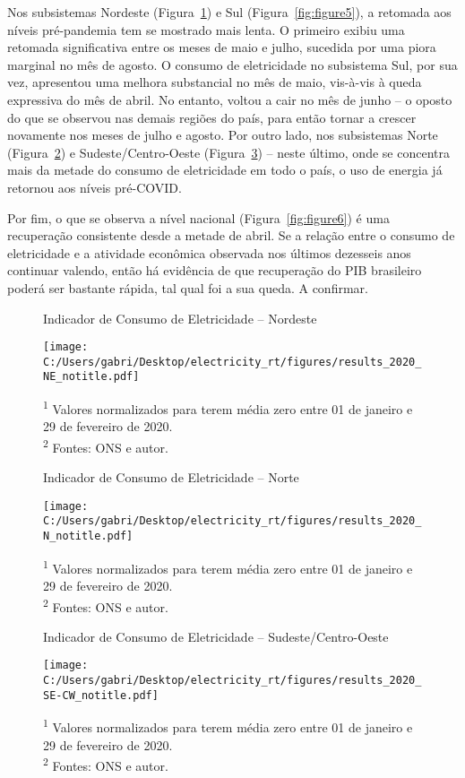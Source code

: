 \documentclass[12pt]{article}
\begin{document}
Nos subsistemas Nordeste (Figura~{\ref{fig:figure2}}) e Sul (Figura~{\ref{fig:figure5}}), a retomada aos níveis pré-pandemia tem se mostrado mais lenta. O primeiro exibiu uma retomada significativa entre os meses de maio e julho, sucedida por uma piora marginal no mês de agosto. O consumo de eletricidade no subsistema Sul, por sua vez, apresentou uma melhora substancial no mês de maio, vis-à-vis à queda expressiva do mês de abril. No entanto, voltou a cair no mês de junho -- o oposto do que se observou nas demais regiões do país, para então tornar a crescer novamente nos meses de julho e agosto. Por outro lado, nos subsistemas Norte (Figura~{\ref{fig:figure3}}) e Sudeste/Centro-Oeste (Figura~{\ref{fig:figure4}}) -- neste último, onde se concentra mais da metade do consumo de eletricidade em todo o país, o uso de energia já retornou aos níveis pré-COVID. 

Por fim, o que se observa a nível nacional (Figura~{\ref{fig:figure6}}) é uma recuperação consistente desde a metade de abril. Se a relação entre o consumo de eletricidade e a atividade econômica observada nos últimos dezesseis anos continuar valendo, então há evidência de que recuperação do PIB brasileiro poderá ser bastante rápida, tal qual foi a sua queda. A confirmar. \vspace{5pt}

\begin{figure}[!htb]
	\centering
	\caption{Indicador de Consumo de Eletricidade -- Nordeste}
	\label{fig:figure2}
	\texttt{[image: C:/Users/gabri/Desktop/electricity\_rt/figures/results\_2020\_NE\_notitle.pdf]}
	\caption*{\textsuperscript{1} Valores normalizados para terem média zero entre 01 de janeiro e 29 de fevereiro de 2020. \\ \textsuperscript{2} Fontes: ONS e autor.}
\end{figure}

\begin{figure}[!htb]
	\centering
	\caption{Indicador de Consumo de Eletricidade -- Norte}
	\label{fig:figure3}
	\texttt{[image: C:/Users/gabri/Desktop/electricity\_rt/figures/results\_2020\_N\_notitle.pdf]}
	\caption*{\textsuperscript{1} Valores normalizados para terem média zero entre 01 de janeiro e 29 de fevereiro de 2020. \\ \textsuperscript{2} Fontes: ONS e autor.}
\end{figure}

\begin{figure}[!htb]
	\centering
	\caption{Indicador de Consumo de Eletricidade -- Sudeste/Centro-Oeste}
	\label{fig:figure4}
	\texttt{[image: C:/Users/gabri/Desktop/electricity\_rt/figures/results\_2020\_SE-CW\_notitle.pdf]}
	\caption*{\textsuperscript{1} Valores normalizados para terem média zero entre 01 de janeiro e 29 de fevereiro de 2020. \\ \textsuperscript{2} Fontes: ONS e autor.}
\end{figure}
\end{document}
